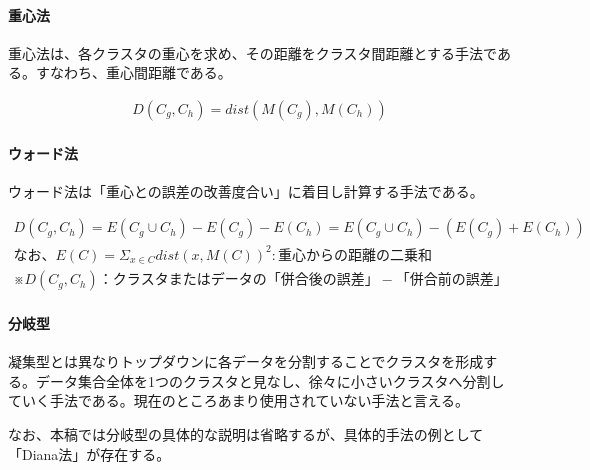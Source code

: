 \documentclass[dvipdfmx]{jsarticle}
\begin{document}
\paragraph{重心法}
重心法は、各クラスタの重心を求め、その距離をクラスタ間距離とする手法である。すなわち、重心間距離である。
\begin{center}
  \begin{eqnarray*}
    D(C_{g}, C_{h}) = dist(M(C_{g}), M(C_{h}))
  \end{eqnarray*}
\end{center}
\paragraph{ウォード法}
ウォード法は「重心との誤差の改善度合い」に着目し計算する手法である。
\begin{center}
\begin{eqnarray*}
  D(C_{g}, C_{h}) = E(C_{g}\cup C_{h}) - E(C_{g}) - E(C_{h})
  = E(C_{g}\cup C_{h}) - (E(C_{g}) + E(C_{h})) \\
  なお、
  E(C) = \Sigma_{x\in C}dist(x, M(C))^{2} : 重心からの距離の二乗和\\
  ※D(C_{g}, C_{h})：クラスタまたはデータの「併合後の誤差」-「併合前の誤差」
\end{eqnarray*}
\end{center}
\paragraph{分岐型}
凝集型とは異なりトップダウンに各データを分割することでクラスタを形成する。データ集合全体を1つのクラスタと見なし、徐々に小さいクラスタへ分割していく手法である。現在のところあまり使用されていない手法と言える。\par
なお、本稿では分岐型の具体的な説明は省略するが、具体的手法の例として「Diana法」が存在する。\par
\end{document}
